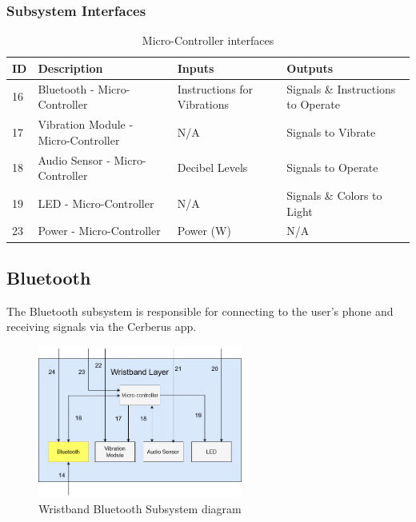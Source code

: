 \subsubsection{Subsystem Interfaces}

\begin {table}[H]
\caption {Micro-Controller interfaces} 
\begin{center}
    \begin{tabular}{ | p{1cm} | p{6cm} | p{3cm} | p{3cm} |}
    \hline
    ID & Description & Inputs & Outputs \\ \hline
    16 & Bluetooth - Micro-Controller & Instructions for Vibrations & Signals \& Instructions to Operate \\ \hline
    17 & Vibration Module - Micro-Controller & N/A & Signals to Vibrate \\ \hline
    18 & Audio Sensor - Micro-Controller & Decibel Levels & Signals to Operate \\ \hline
    19 & LED - Micro-Controller & N/A & Signals \& Colors to Light \\ \hline
    23 & Power - Micro-Controller & Power (W) & N/A \\ \hline
    \end{tabular}
\end{center}
\end{table}

\subsection{Bluetooth}
The Bluetooth subsystem is responsible for connecting to the user's phone and receiving signals via the Cerberus app.

\begin{figure}[h!]
	\centering
 	\includegraphics[width=0.60\textwidth]{images/wristband-bluetooth.jpg}
 \caption{Wristband Bluetooth Subsystem diagram}
\end{figure}

